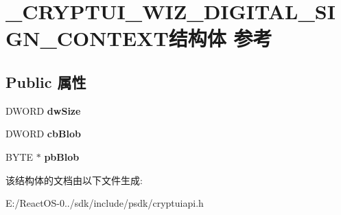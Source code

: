 \hypertarget{struct___c_r_y_p_t_u_i___w_i_z___d_i_g_i_t_a_l___s_i_g_n___c_o_n_t_e_x_t}{}\section{\+\_\+\+C\+R\+Y\+P\+T\+U\+I\+\_\+\+W\+I\+Z\+\_\+\+D\+I\+G\+I\+T\+A\+L\+\_\+\+S\+I\+G\+N\+\_\+\+C\+O\+N\+T\+E\+X\+T结构体 参考}
\label{struct___c_r_y_p_t_u_i___w_i_z___d_i_g_i_t_a_l___s_i_g_n___c_o_n_t_e_x_t}
\subsection*{Public 属性}
\begin{DoxyCompactItemize}
\item 
\mbox{\label{struct___c_r_y_p_t_u_i___w_i_z___d_i_g_i_t_a_l___s_i_g_n___c_o_n_t_e_x_t_a9457b47fb86593453b02774461e7bd4e}} 
D\+W\+O\+RD {\bfseries dw\+Size}
\item 
\mbox{\label{struct___c_r_y_p_t_u_i___w_i_z___d_i_g_i_t_a_l___s_i_g_n___c_o_n_t_e_x_t_acdb21279070bf3e76f4a0fa0d2a5e271}} 
D\+W\+O\+RD {\bfseries cb\+Blob}
\item 
\mbox{\label{struct___c_r_y_p_t_u_i___w_i_z___d_i_g_i_t_a_l___s_i_g_n___c_o_n_t_e_x_t_a4a1f2a86bda661054ad69ee4d0418b6c}} 
B\+Y\+TE $\ast$ {\bfseries pb\+Blob}
\end{DoxyCompactItemize}


该结构体的文档由以下文件生成\+:\begin{DoxyCompactItemize}
\item 
E\+:/\+React\+O\+S-\/0../sdk/include/psdk/cryptuiapi.\+h\end{DoxyCompactItemize}
